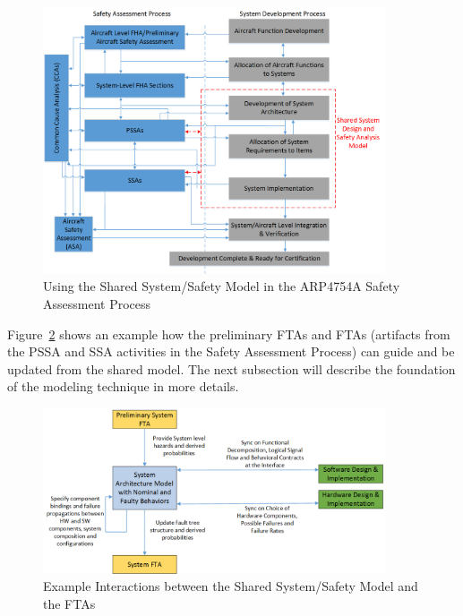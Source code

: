 \begin{figure}[h!]
	\vspace{-0.19in}
	\begin{center}
		\includegraphics[trim=0 9 0 5,clip,width=0.9\textwidth]{images/Safety_Assessment_Process_update.png}
	\end{center}
	\caption{Using the Shared System/Safety Model in the ARP4754A Safety Assessment Process}
	\label{fig:proposed_safety_process}
\end{figure}

Figure~\ref{fig:interaction_with_FTA} shows an example how the preliminary FTAs and FTAs (artifacts from the PSSA and SSA activities in the Safety Assessment Process) can guide and be updated from the shared model. The next subsection will describe the foundation of the modeling technique in more details.

\begin{figure}[h!]
	\vspace{-0.19in}
	\begin{center}
		\includegraphics[width=0.9\textwidth]{images/FTA_MBD_Workflow.png}
	\end{center}
	\caption{Example Interactions between the Shared System/Safety Model and  the FTAs}
	\label{fig:interaction_with_FTA}
\end{figure}
